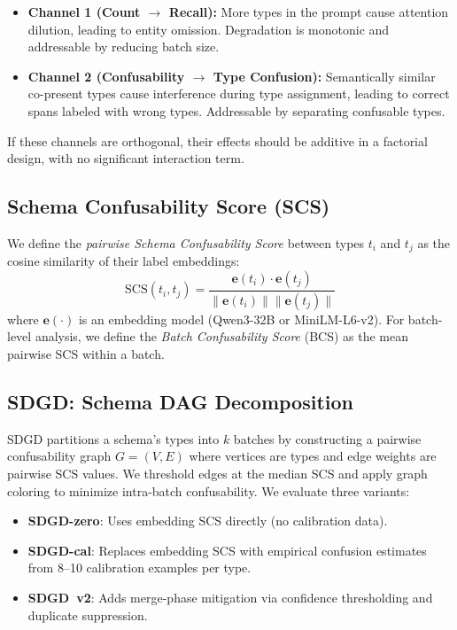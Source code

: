 \documentclass[11pt,a4paper]{article}
\begin{document}
\begin{itemize}
    \item \textbf{Channel 1 (Count $\to$ Recall):} More types in the prompt cause attention dilution, leading to entity omission. Degradation is monotonic and addressable by reducing batch size.
    \item \textbf{Channel 2 (Confusability $\to$ Type Confusion):} Semantically similar co-present types cause interference during type assignment, leading to correct spans labeled with wrong types. Addressable by separating confusable types.
\end{itemize}

If these channels are orthogonal, their effects should be additive in a factorial design, with no significant interaction term.

\subsection{Schema Confusability Score (SCS)}

We define the \emph{pairwise Schema Confusability Score} between types $t_i$ and $t_j$ as the cosine similarity of their label embeddings:
\begin{equation}
    \text{SCS}(t_i, t_j) = \frac{\mathbf{e}(t_i) \cdot \mathbf{e}(t_j)}{\|\mathbf{e}(t_i)\| \|\mathbf{e}(t_j)\|}
\end{equation}
where $\mathbf{e}(\cdot)$ is an embedding model (Qwen3-32B or MiniLM-L6-v2). For batch-level analysis, we define the \emph{Batch Confusability Score} (BCS) as the mean pairwise SCS within a batch.

\subsection{SDGD: Schema DAG Decomposition}
\label{sec:sdgd-design}

SDGD partitions a schema's types into $k$ batches by constructing a pairwise confusability graph $G = (V, E)$ where vertices are types and edge weights are pairwise SCS values. We threshold edges at the median SCS and apply graph coloring to minimize intra-batch confusability. We evaluate three variants:

\begin{itemize}
    \item \textbf{SDGD-zero}: Uses embedding SCS directly (no calibration data).
    \item \textbf{SDGD-cal}: Replaces embedding SCS with empirical confusion estimates from 8--10 calibration examples per type.
    \item \textbf{SDGD~v2}: Adds merge-phase mitigation via confidence thresholding and duplicate suppression.
\end{itemize}
\end{document}
